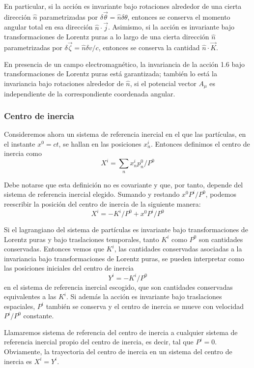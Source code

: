 En particular, si la acción es invariante bajo rotaciones alrededor de una cierta dirección $\hat{n}$ parametrizadas por $\delta \vec{\theta}=\hat{n} \delta \theta$, entonces se conserva el momento angular total en esa dirección $\hat{n} \cdot \vec{j}$. Asimismo, si la acción es invariante bajo transformaciones de Lorentz puras a lo largo de una cierta dirección $\hat{n}$ parametrizadas por $\delta \vec{\zeta}=\hat{n} \delta v / c$, entonces se conserva la cantidad $\hat{n} \cdot \vec{K}$.

En presencia de un campo electromagnético, la invariancia de la acción 1.6 bajo transformaciones de Lorentz puras está garantizada; también lo está la invariancia bajo rotaciones alrededor de $\hat{n}$, si el potencial vector $A_{\mu}$ es independiente de la correspondiente coordenada angular.
\subsubsection{Centro de inercia}
Consideremos ahora un sistema de referencia inercial en el que las partículas, en el instante $x^{0}=c t$, se hallan en las posiciones $x_{n}^{i}$. Entonces definimos el centro de inercia como
$$
X^{i}=\sum_{n} x_{n}^{i} p_{n}^{0} / P^{0}
$$

Debe notarse que esta definición no es covariante y que, por tanto, depende del sistema de referencia inercial elegido. Sumando y restando $x^{0} P^{i} / P^{0}$, podemos reescribir la posición del centro de inercia de la siguiente manera:
$$
X^{i}=-K^{i} / P^{0}+x^{0} P^{i} / P^{0}
$$

Si el lagrangiano del sistema de partículas es invariante bajo transformaciones de Lorentz puras y bajo traslaciones temporales, tanto $K^{i}$ como $P^{0}$ son cantidades conservadas. Entonces vemos que $K^{i}$, las cantidades conservadas asociadas a la invariancia bajo transformaciones de Lorentz puras, se pueden interpretar como las posiciones iniciales del centro de inercia
$$
Y^{i}=-K^{i} / P^{0}
$$
en el sistema de referencia inercial escogido, que son cantidades conservadas equivalentes a las $K^{i}$. Si además la acción es invariante bajo traslaciones espaciales, $P^{i}$ también se conserva y el centro de inercia se mueve con velocidad $P^{i} / P^{0}$ constante.

Llamaremos sistema de referencia del centro de inercia a cualquier sistema de referencia inercial propio del centro de inercia, es decir, tal que $P^{i}=0$. Obviamente, la trayectoria del centro de inercia en un sistema del centro de inercia es $X^{i}=Y^{i}$.

